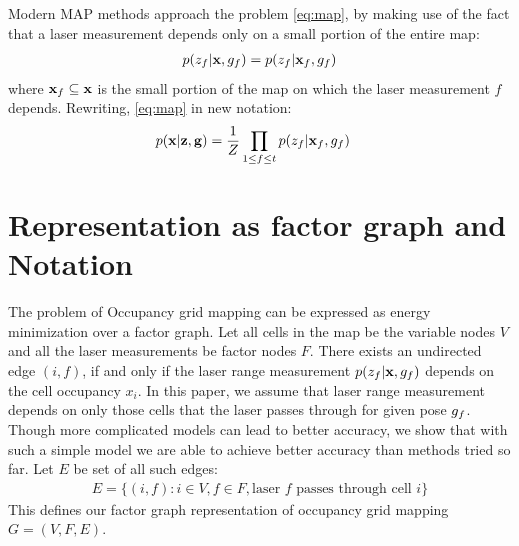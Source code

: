 \documentclass[letterpaper, 10 pt, conference]{ieeeconf} %
\begin{document}
   Modern MAP methods approach the problem \eqref{eq:map}, by making use of the fact that a laser measurement depends only on a small portion of the entire map:
   \begin{align}
     p(z_f |\mathbf{x}, g_f) = p(z_f|\mathbf{x}_f, g_f)
   \end{align}
   where $\mathbf{x}_f \subseteq \mathbf{x}$ is the small portion of the map on which the laser measurement $f$ depends. Rewriting, \eqref{eq:map} in new notation:
   \begin{align}
     p(\mathbf{x} | \mathbf{z}, \mathbf{g}) &= \frac{1}{Z} \prod_{1 \le f \le t} p(z_f|\mathbf{x}_f, g_f)
     \label{eq:modernmap}
   \end{align}


\section{Representation as factor graph and Notation}
\label{sec:notation}
The problem of Occupancy grid mapping can be expressed as energy minimization
over a factor graph. Let all cells in the map be the variable nodes $V$ and all
the laser measurements be factor nodes $F$. 
There exists an undirected edge $(i, f)$, if and only if the laser
range measurement $p(z_f|\mathbf{x}, g_f)$ depends on the cell occupancy 
$x_i$. In this paper, we assume that laser range measurement depends on only
those cells that the laser passes through for given pose $g_f$. Though more
complicated models can lead to better accuracy, we show that with such a simple
model we are able to achieve better accuracy than methods tried so far.
Let $E$ be set of all such edges:
\begin{align}
  E = \{(i, f) : i \in V, f \in F, \text{laser $f$ passes through cell $i$}\}
\end{align}
This defines our factor graph representation of occupancy grid mapping $G = (V, F, E)$.

%
%
\end{document}
